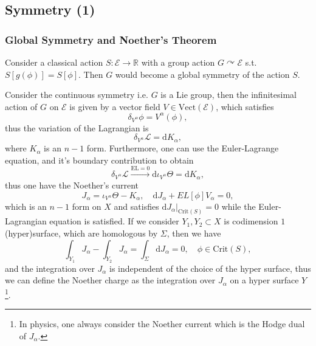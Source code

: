 \documentclass[10pt]{article}
\begin{document}
\subsection{Symmetry (1)}

\subsubsection{Global Symmetry and Noether's Theorem}

Consider a classical action $ S: \mathcal{E} \rightarrow \mathbb{R}$ with a group action $ G \curvearrowright \mathcal{E}$ s.t. $ S[g(\phi)] = S[\phi]$. Then $ G$ would become a global symmetry of the action $ S$.

Consider the continuous symmetry i.e. $ G$ is a Lie group, then the infinitesimal action of $ G$ on $ \mathcal{E}$ is given by a vector field $ V \in \mathrm{Vect}(\mathcal{E})$, which satisfies
\begin{equation*}
  \delta_{V^{\alpha}} \phi = V^{\alpha} (\phi),
\end{equation*}
thus the variation of the Lagrangian is
\begin{equation*}
  \delta_{V^{\alpha}} \mathcal{L} = \mathrm{d} K_{\alpha},
\end{equation*}
where $ K_{\alpha}$ is an $ n-1$ form. Furthermore, one can use the Euler-Lagrange equation, and it's boundary contribution to obtain
\begin{equation*}
  \delta_{V^{\alpha}} \mathcal{L} \xrightarrow{\mathrm{EL} = 0} \mathrm{d} \iota_{V^{\alpha}} \Theta = \mathrm{d} K_{\alpha},
\end{equation*}
thus one have the Noether's current
\begin{equation}\label{eq:NoetherCurrent}
  J_{\alpha} = \iota_{V^{\alpha}}\Theta - K_{\alpha}, \quad \mathrm{d} J_{\alpha} + EL[\phi] V_{\alpha} = 0,
\end{equation}
which is an $ n-1$ form on $ X$ and satisfies $ \mathrm{d} J_{\alpha}\big|_{\mathrm{Crit}(S)} = 0$ while the Euler-Lagrangian equation is satisfied.
If we consider $ Y_1, Y_2 \subset X$ is codimension $ 1$ (hyper)surface, which are homologous by $ \Sigma$, then we have
\begin{equation*}
  \int _{Y_1} J_{\alpha} - \int _{Y_2} J_{\alpha} = \int _{\Sigma} \mathrm{d} J_{\alpha} = 0, \quad \phi \in \mathrm{Crit}(S),
\end{equation*}
and the integration over $ J_{\alpha}$ is independent of the choice of the hyper surface, thus we can define the Noether charge as the integration over $ J_{\alpha}$ on a hyper surface $ Y$\footnote{In physics, one always consider the Noether current which is the Hodge dual of $J_{\alpha}$.}.
\end{document}
